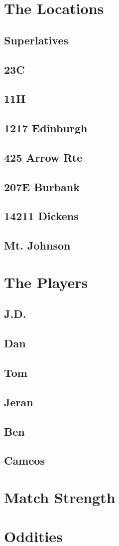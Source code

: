   \chapter{The Locations}
    \section{Superlatives}
    \section{23C}
    \section{11H}
    \section{1217 Edinburgh}
    \section{425 Arrow Rte}
    \section{207E Burbank} 
    \section{14211 Dickens}
    \section{Mt. Johnson}
  \chapter{The Players}
    \section{J.D.}
    \section{Dan}
    \section{Tom}
    \section{Jeran}
    \section{Ben}
    \section{Cameos}
  \chapter{Match Strength}
  \chapter{Oddities}